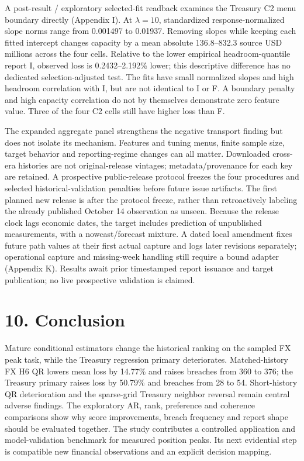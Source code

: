 \documentclass[10pt,a4paper]{article}
\begin{document}
A post-result / exploratory selected-fit readback examines the Treasury C2 menu boundary directly (Appendix I). At \(\lambda=10\), standardized response-normalized slope norms range from 0.001497 to 0.01937. Removing slopes while keeping each fitted intercept changes capacity by a mean absolute 136.8--832.3 source USD millions across the four cells. Relative to the lower empirical headroom-quantile report I, observed loss is 0.2432--2.192\% lower; this descriptive difference has no dedicated selection-adjusted test. The fits have small normalized slopes and high headroom correlation with I, but are not identical to I or F. A boundary penalty and high capacity correlation do not by themselves demonstrate zero feature value. Three of the four C2 cells still have higher loss than F.

The expanded aggregate panel strengthens the negative transport finding but does not isolate its mechanism. Features and tuning menus, finite sample size, target behavior and reporting-regime changes can all matter. Downloaded cross-era histories are not original-release vintages; metadata/provenance for each key are retained. A prospective public-release protocol freezes the four procedures and selected historical-validation penalties before future issue artifacts. The first planned new release is after the protocol freeze, rather than retroactively labeling the already published October 14 observation as unseen. Because the release clock lags economic dates, the target includes prediction of unpublished measurements, with a nowcast/forecast mixture. A dated local amendment fixes future path values at their first actual capture and logs later revisions separately; operational capture and missing-week handling still require a bound adapter (Appendix K). Results await prior timestamped report issuance and target publication; no live prospective validation is claimed.

\section*{10. Conclusion}
Mature conditional estimators change the historical ranking on the sampled FX peak task, while the Treasury regression primary deteriorates. Matched-history FX H6 QR lowers mean loss by 14.77\% and raises breaches from 360 to 376; the Treasury primary raises loss by 50.79\% and breaches from 28 to 54. Short-history QR deterioration and the sparse-grid Treasury neighbor reversal remain central adverse findings. The exploratory AR, rank, preference and coherence comparisons show why score improvements, breach frequency and report shape should be evaluated together. The study contributes a controlled application and model-validation benchmark for measured position peaks. Its next evidential step is compatible new financial observations and an explicit decision mapping.
\end{document}
